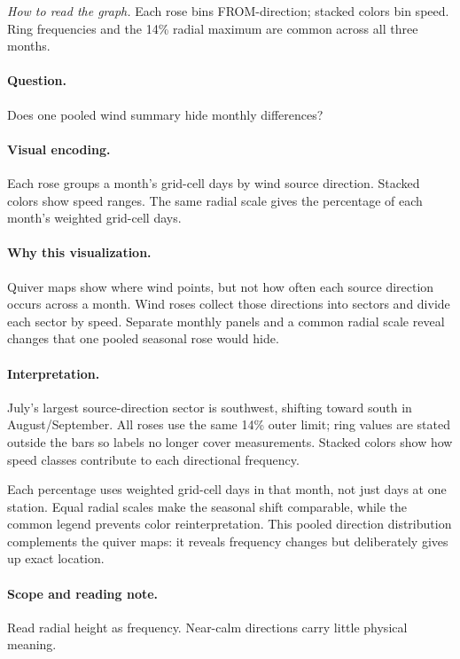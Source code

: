 \documentclass[conference,a4paper]{IEEEtran}
\begin{document}
\noindent\textit{How to read the graph.} Each rose bins FROM-direction; stacked colors bin speed. Ring frequencies and the 14\% radial maximum are common across all three months.

\paragraph{Question.} Does one pooled wind summary hide monthly differences?



\paragraph{Visual encoding.} Each rose groups a month's grid-cell days by wind source direction. Stacked colors show speed ranges. The same radial scale gives the percentage of each month's weighted grid-cell days.



\paragraph{Why this visualization.} Quiver maps show where wind points, but not how often each source direction occurs across a month. Wind roses collect those directions into sectors and divide each sector by speed. Separate monthly panels and a common radial scale reveal changes that one pooled seasonal rose would hide.



\paragraph{Interpretation.} July's largest source-direction sector is southwest, shifting toward south in August/September. All roses use the same 14\% outer limit; ring values are stated outside the bars so labels no longer cover measurements. Stacked colors show how speed classes contribute to each directional frequency.

Each percentage uses weighted grid-cell days in that month, not just days at one station. Equal radial scales make the seasonal shift comparable, while the common legend prevents color reinterpretation. This pooled direction distribution complements the quiver maps: it reveals frequency changes but deliberately gives up exact location.



\paragraph{Scope and reading note.} Read radial height as frequency. Near-calm directions carry little physical meaning.
\end{document}
